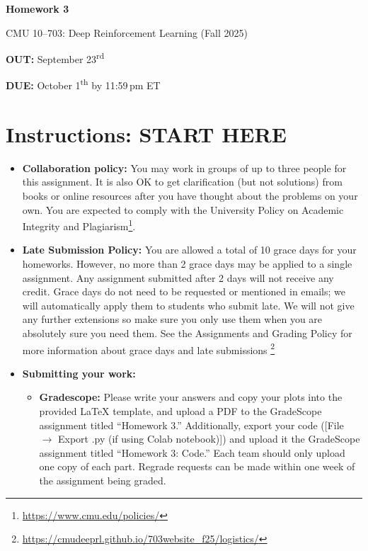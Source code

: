 \documentclass[12pt]{article}
\begin{document}
\begin{center}
  {\LARGE\bfseries Homework 3\par}
  \vspace{0.6ex}
  {\large CMU 10–703: Deep Reinforcement Learning (Fall 2025)\par}
  \vspace{0.8ex}
  {\normalsize \textbf{OUT:} September 23\textsuperscript{rd}\par}
  {\normalsize \textbf{DUE:} October 1\textsuperscript{th} by 11:59\,pm ET\par}
\end{center}

\section*{Instructions: START HERE}
\begin{itemize}
\item \textbf{Collaboration policy:} You may work in groups of up to three people for this assignment. It is also OK to get clarification (but not solutions) from books or online resources after you have thought about the problems on your own.  You are expected to comply with the University Policy on Academic Integrity and Plagiarism\footnote{\url{https://www.cmu.edu/policies/}}.

\item\textbf{Late Submission Policy:} You are allowed a total of 10 grace days for your homeworks. However, no more than 2 grace days may be applied to a single assignment. Any assignment submitted after 2 days will not receive any credit.  Grace days do not need to be requested or mentioned in emails; we will automatically apply them to students who submit late. We will not give any further extensions so make sure you only use them when you are absolutely sure you need them.  See the Assignments and Grading Policy for more information about grace days and late submissions \footnote{\url{https://cmudeeprl.github.io/703website_f25/logistics/}}

\item\textbf{Submitting your work:} 

\begin{itemize}

\item \textbf{Gradescope:} Please write your answers and copy your plots into the provided LaTeX template, and upload a PDF to the GradeScope assignment titled ``Homework 3.'' Additionally, export your code ([File $\rightarrow$ Export .py (if using Colab notebook)]) and upload it the GradeScope assignment titled ``Homework 3: Code.'' Each team should only upload one copy of each part. Regrade requests can be made within one week of the assignment being graded.

\end{itemize}
\end{itemize}
\end{document}
